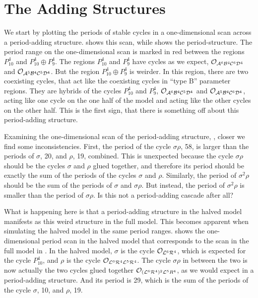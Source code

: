 \section{The Adding Structures}
\label{sec:add.add}

We start by plotting the periods of stable cycles in a one-dimensional scan across a period-adding structure.
 shows this scan, while  shows the period-structure.
The period range on the one-dimensional scan is marked in red between the regions $P_{10}^4$ and $P_{10}^4 \oplus P_9^4$.
The regions $P_{10}^4$ and $P_9^4$ have cycles as we expect, $\mathcal{O}_{\mathcal{A}^6\mathcal{B}^4\mathcal{C}^6\mathcal{D}^4}$ and $\mathcal{O}_{\mathcal{A}^5\mathcal{B}^4\mathcal{C}^5\mathcal{D}^4}$.
But the region $P_{10}^4 \oplus P_9^4$ is weirder.
In this region, there are two coexisting cycles, that act like the coexisting cycles in ``type B'' parameter regions.
They are hybrids of the cycles $P_{10}^4$ and $P_9^4$, $\mathcal{O}_{\mathcal{A}^6\mathcal{B}^4\mathcal{C}^5\mathcal{D}^4}$ and $\mathcal{O}_{\mathcal{A}^5\mathcal{B}^4\mathcal{C}^6\mathcal{D}^4}$, acting like one cycle on the one half of the model and acting like the other cycles on the other half.
This is the first sign, that there is something off about this period-adding structure.

Examining the one-dimensional scan of the period-adding structure, , closer we find some inconsistencies.
First, the period of the cycle $\sigma\rho$, 58, is larger than the periods of $\sigma$, 20, and $\rho$, 19, combined.
This is unexpected because the cycle $\sigma\rho$ should be the cycles $\sigma$ and $\rho$ glued together, and therefore its period should be exactly the sum of the periods of the cycles $\sigma$ and $\rho$.
Similarly, the period of $\sigma^2\rho$ should be the sum of the periods of $\sigma$ and $\sigma\rho$.
But instead, the period of $\sigma^2\rho$ is smaller than the period of $\sigma\rho$.
Is this not a period-adding cascade after all?

What is happening here is that a period-adding structure in the halved model manifests as this weird structure in the full model.
This becomes apparent when simulating the halved model in the same period ranges.
 shows the one-dimensional period scan in the halved model that corresponds to the scan in the full model in .
In the halved model, $\sigma$ is the cycle $\mathcal{O}_{\mathcal{L}^6\mathcal{R}^4}$, which is expected for the cycle $P_{10}^4$, and $\rho$ is the cycle $\mathcal{O}_{\mathcal{L}^6\mathcal{R}^4\mathcal{L}^5\mathcal{R}^4}$.
The cycle $\sigma\rho$ in between the two is now actually the two cycles glued together $\mathcal{O}_{(\mathcal{L}^6\mathcal{R}^4)^2\mathcal{L}^5R^4}$, as we would expect in a period-adding structure.
And its period is 29, which is the sum of the periods of the cycle $\sigma$, 10, and $\rho$, 19.

